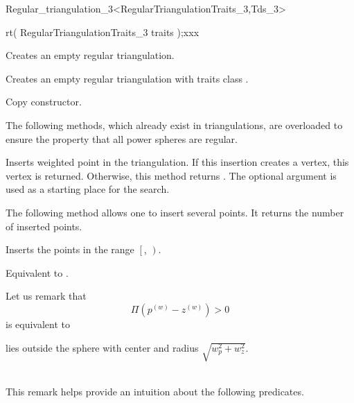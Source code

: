 \begin{ccRefClass}{Regular_triangulation_3<RegularTriangulationTraits_3,Tds_3>}
\ccCreation
{}  %


{rt( RegularTriangulationTraits_3 traits );xxx}{}

{Creates an empty regular triangulation.}

{Creates an empty regular triangulation with traits class
.}

{Copy constructor.}

\ccOperations



The following methods, which already exist in triangulations, are
overloaded to ensure the property that all power spheres are regular.

{Inserts weighted point  in the triangulation. If this
insertion creates a vertex, this vertex is returned. Otherwise, this
method returns .
The optional argument  is used as a starting place for the search.}

The following method allows one to insert several points. It returns the
number of inserted points. 

{Inserts the points in the range $\left[\right.$,
$\left.\right)$. 
}

{Equivalent to .}


Let us remark that 
\[\Pi({p}^{(w)}-{z}^{(w)}) > 0\]
is equivalent to\\
\centerline{ lies outside the sphere with center  and radius
$\sqrt{w_p^2+w_z^2}$.}\\
This remark helps provide an intuition about the following predicates.


\end{ccRefClass}
